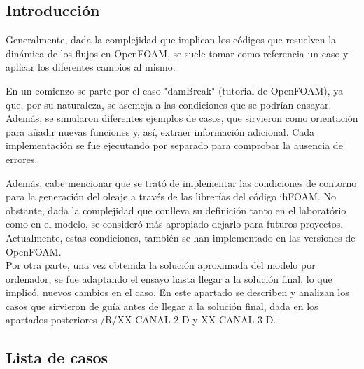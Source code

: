 \subsection{Introducción}\label{header-n2}

Generalmente, dada la complejidad que implican los códigos que resuelven
la dinámica de los flujos en OpenFOAM, se suele tomar como referencia un
caso y aplicar los diferentes cambios al mismo.

En un comienzo se parte por el caso "damBreak" (tutorial de OpenFOAM),
ya que, por su naturaleza, se asemeja a las condiciones que se podrían
ensayar. Además, se simularon diferentes ejemplos de casos, que
sirvieron como orientación para añadir nuevas funciones y, así, extraer
información adicional. Cada implementación se fue ejecutando por
separado para comprobar la ausencia de errores.

Además, cabe mencionar que se trató de implementar las condiciones de
contorno para la generación del oleaje a través de las librerías del
código ihFOAM. No obstante, dada la complejidad que conlleva su
definición tanto en el laboratório como en el modelo, se consideró más
apropiado dejarlo para futuros proyectos. Actualmente, estas
condiciones, también se han implementado en las versiones de OpenFOAM.\\

Por otra parte, una vez obtenida la solución aproximada del modelo por
ordenador, se fue adaptando el ensayo hasta llegar a la solución final,
lo que implicó, nuevos cambios en el caso. En este apartado se describen
y analizan los casos que sirvieron de guía antes de llegar a la solución
final, dada en los apartados posteriores /R/XX CANAL 2-D y XX CANAL 3-D.

\subsection{Lista de casos}\label{header-n13}

